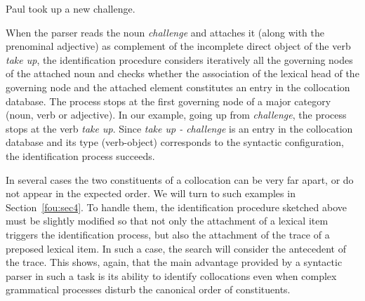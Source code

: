 \documentclass[output=paper]{langsci/langscibook}
\begin{document}


\begin{exe}
  \ex\label{fou:exFirst}
  Paul took up a new challenge.\\
  {\small {} }
\end{exe}

When the parser reads the noun \textit{challenge} and attaches it (along with the prenominal adjective) as complement of the incomplete   direct object of the verb \textit{take up}, the identification procedure considers iteratively all the governing nodes of the attached noun and checks whether the association of the lexical head of the governing node and the attached element constitutes an entry in the collocation database. The process stops at the first governing node of a major category (noun, verb or adjective). In our example, going up from \textit{challenge}, the process stops at the verb \textit{take up}. Since \textit{take up - challenge} is an entry in the collocation database and its type (verb-object) corresponds to the syntactic configuration, the identification process succeeds.

In several cases the two constituents of a collocation can be very far apart, or do not appear in the expected order. We will turn to such examples in Section~\ref{fou:sec4}. To handle them, the identification procedure sketched above must be slightly modified so that not only the attachment of a lexical item triggers the identification process, but also the attachment of the trace of a preposed lexical item. In such a case, the search will consider the antecedent of the trace. 
This shows, again, that the main advantage provided by a syntactic parser in such a task is its ability to identify collocations even when complex grammatical processes disturb the canonical order of constituents.
\end{document}

